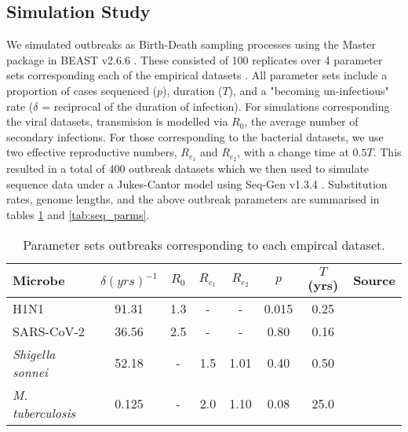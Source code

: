\documentclass{article}
\begin{document}
\begin{spacing}{1.5}
\subsection*{Simulation Study}
We simulated outbreaks as Birth-Death sampling processes using the Master package in BEAST v2.6.6 \citep{vaughan_stochastic_2013,bouckaert_beast_2019}. These consisted of 100 replicates over 4 parameter sets corresponding each of the empirical datasets . All parameter sets include a proportion of cases sequenced ($p$), duration ($T$), and a "becoming un-infectious" rate ($\delta$ = reciprocal of the duration of infection). For simulations corresponding the viral datasets, transmision is modelled via $R_0$, the average number of secondary infections. For those corresponding to the bacterial datasets, we use two effective reproductive numbers, $R_{e_1}$ and $R_{e_2}$, with a change time at $0.5T$. This resulted in a total of 400 outbreak datasets which we then used to simulate sequence data under a Jukes-Cantor model using Seq-Gen v1.3.4 \citep{rambaut_seq-gen_1997}. Substitution rates, genome lengths, and the above outbreak parameters are summarised in tables \ref{tab:sim_parms} and \ref{tab:seq_parms}.

\begin{table}[ht]
    \centering
    \caption{Parameter sets outbreaks corresponding to each empircal dataset.}
    \begin{tabular}{l|c|c|c|c|c|c|l|}
    \hline
    Microbe                     &   $\delta (yrs)^{-1}$    & $R_0$ &   $R_{e_1}$   &  $R_{e_2}$    &   $p$   &   $T$(yrs)   & Source \\
    \hline
    H1N1                        &   91.31    & 1.3 &   -   &  -    &   0.015   &   0.25 & \citet{hedge_2013_real-time} \\
    SARS-CoV-2                  &   36.56    & 2.5 &   -   &  -   &   0.80   &  0.16 & \citet{lane2021genomics} \\
    \textit{Shigella sonnei}    &   52.18    &  - &   1.5   &  1.01   &   0.40   &   0.50 & \citet{ingle_co-circulation_2019} \\
    \textit{M. tuberculosis}    &   0.125    &  - &   2.0   &  1.10    &   0.08   &   25.0 & \citet{kuhnert_tuberculosis_2018} \\
    \hline
    \end{tabular}
    \label{tab:sim_parms}
\end{table}


\end{spacing}
\end{document}
